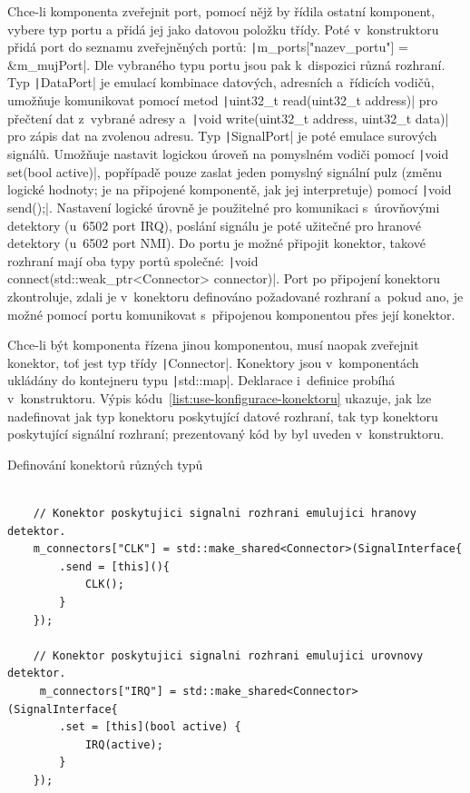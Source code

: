 Chce-li komponenta zveřejnit port, pomocí nějž by řídila ostatní komponent, vybere typ portu a přidá jej jako datovou položku třídy. Poté v~konstruktoru přidá port do seznamu zveřejněných portů: \texttt|m_ports["nazev_portu"] = &m_mujPort|. Dle vybraného typu portu jsou pak k~dispozici různá rozhraní. Typ \texttt|DataPort| je emulací kombinace datových, adresních a~řídicích vodičů, umožňuje komunikovat pomocí metod \texttt|uint32_t read(uint32_t address)| pro přečtení dat z~vybrané adresy a~\texttt|void write(uint32_t address, uint32_t data)| pro zápis dat na zvolenou adresu. Typ \texttt|SignalPort| je poté emulace surových signálů. Umožňuje nastavit logickou úroveň na pomyslném vodiči pomocí \texttt|void set(bool active)|, popřípadě pouze zaslat jeden pomyslný signální pulz (změnu logické hodnoty; je na připojené komponentě, jak jej interpretuje) pomocí \texttt|void send();|. Nastavení logické úrovně je použitelné pro komunikaci s~úrovňovými detektory (u~6502 port IRQ), poslání signálu je poté užitečné pro hranové detektory (u~6502 port NMI).  Do portu je možné připojit konektor, takové rozhraní mají oba typy portů společné: \texttt|void connect(std::weak_ptr<Connector> connector)|. Port po připojení konektoru zkontroluje, zdali je v~konektoru definováno požadované rozhraní a~pokud ano, je možné pomocí portu komunikovat s~připojenou komponentou přes její konektor.

Chce-li být komponenta řízena jinou komponentou, musí naopak zveřejnit konektor, toť jest typ třídy \texttt|Connector|.  Konektory jsou v~komponentách ukládány do kontejneru typu \texttt|std::map|. Deklarace i~definice probíhá v~konstruktoru. Výpis kódu~\ref{list:use-konfigurace-konektoru} ukazuje, jak lze nadefinovat jak typ konektoru poskytující datové rozhraní, tak typ konektoru poskytující signální rozhraní; prezentovaný kód by byl uveden v~konstruktoru.

\begin{listing}
	\caption{Definování konektorů různých typů}
	\label{list:use-konfigurace-konektoru}
	\begin{verbatim}
		
	// Konektor poskytujici signalni rozhrani emulujici hranovy detektor.
    m_connectors["CLK"] = std::make_shared<Connector>(SignalInterface{
		.send = [this](){
			CLK();
		}
	});
	
	// Konektor poskytujici signalni rozhrani emulujici urovnovy detektor.
	 m_connectors["IRQ"] = std::make_shared<Connector>(SignalInterface{
		.set = [this](bool active) {
			IRQ(active);
		}
	});
	
	

	\end{verbatim}
\end{listing}

